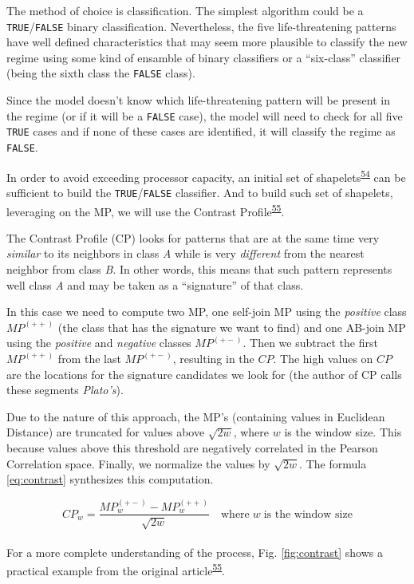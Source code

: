 \documentclass[12pt,twoside]{fmupthesis}
\begin{document}
The method of choice is classification. The simplest algorithm could be a \texttt{TRUE}/\texttt{FALSE} binary
classification. Nevertheless, the five life-threatening patterns have well defined characteristics
that may seem more plausible to classify the new regime using some kind of ensamble of binary
classifiers or a ``six-class'' classifier (being the sixth class the \texttt{FALSE} class).

Since the model doesn't know which life-threatening pattern will be present in the regime (or if it
will be a \texttt{FALSE} case), the model will need to check for all five \texttt{TRUE} cases and if none of these
cases are identified, it will classify the regime as \texttt{FALSE}.

In order to avoid exceeding processor capacity, an initial set of shapelets\textsuperscript{\protect\hyperlink{ref-Rakthanmanon2013}{54}} can
be sufficient to build the \texttt{TRUE}/\texttt{FALSE} classifier. And to build such set of shapelets, leveraging
on the MP, we will use the Contrast Profile\textsuperscript{\protect\hyperlink{ref-Mercer2021}{55}}.

The Contrast Profile (CP) looks for patterns that are at the same time very \emph{similar} to its
neighbors in class \emph{A} while is very \emph{different} from the nearest neighbor from class \emph{B}. In other
words, this means that such pattern represents well class \emph{A} and may be taken as a ``signature'' of
that class.

In this case we need to compute two MP, one self-join MP using the \emph{positive} class \(MP^{(++)}\) (the
class that has the signature we want to find) and one AB-join MP using the \emph{positive} and \emph{negative}
classes \(MP^{(+-)}\). Then we subtract the first \(MP^{(++)}\) from the last \(MP^{(+-)}\), resulting in
the \(CP\). The high values on \(CP\) are the locations for the signature candidates we look for (the
author of CP calls these segments \emph{Plato's}).

Due to the nature of this approach, the MP's (containing values in Euclidean Distance) are truncated
for values above \(\sqrt{2w}\), where \(w\) is the window size. This because values above this threshold
are negatively correlated in the Pearson Correlation space. Finally, we normalize the values by
\(\sqrt{2w}\). The formula \eqref{eq:contrast} synthesizes this computation.

\hfill\break
\begin{equation}
CP_w = \frac{MP_{w}^{(+-)} - MP_{w}^{(++)}}{\sqrt{2w}} \quad \text{where}\; w \; \text{is the window size} \label{eq:contrast}
\end{equation}\\
For a more complete understanding of the process, Fig. \ref{fig:contrast} shows a practical example
from the original article\textsuperscript{\protect\hyperlink{ref-Mercer2021}{55}}.
\end{document}
